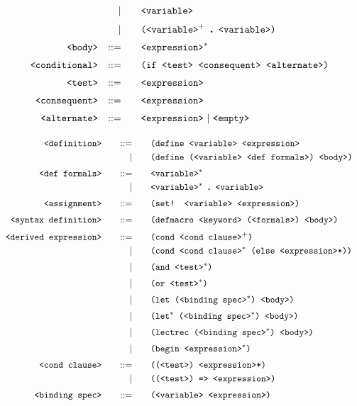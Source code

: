 \documentclass{article}
\begin{document}
\begin{alignat*}{7}
&&                       && |   &\quad && \texttt{<variable>}  \\[1mm]
&&                       && |   &\quad && \texttt{(<variable>$^+$ \bm{$.$} <variable>)}  \\[1mm]
&& \texttt{<body>}  && ::= &\quad && \texttt{<expression>$^*$}\\[1mm]
&& \texttt{<conditional>}  && ::= &\quad && \texttt{(if <test> <consequent> <alternate>)}\\[1mm]
&& \texttt{<test>}  && ::= &\quad && \texttt{<expression>}\\[1mm]
&& \texttt{<consequent>}  && ::= &\quad && \texttt{<expression>}\\[1mm]
&& \texttt{<alternate>}  && ::= &\quad && \texttt{<expression>}\ | \ \texttt{<empty>}\\[1mm]
\end{alignat*}

\newpage
\begin{alignat*}{7}
&& \texttt{<definition>}    &&\quad ::= &\quad && \texttt{(define <variable> <expression>}\\
&&                       && |   &\quad && \texttt{(define (<variable> <def formals>) <body>)}  \\[1mm]
&& \texttt{<def formals>}    &&\quad ::= &\quad && \texttt{<variable>$^*$}\\
&&                       && |   &\quad && \texttt{<variable>$^*$ \bm{$.$} <variable>}\\[1mm]
&& \texttt{<assignment>}  && ::= &\quad && \texttt{(set! <variable> <expression>)} \\[1mm]
&& \texttt{<syntax definition>}  && ::= &\quad && \texttt{(defmacro <keyword> (<formals>) <body>)}\\[1mm]
&& \texttt{<derived expression>}    &&::= &\quad && \texttt{(cond <cond clause>$^+$)}\\
&&                       && |   &\quad && \texttt{(cond <cond clause>$^*$ (else <expression>*))}  \\[1mm]
&&                       && |   &\quad && \texttt{(and <test>$^*$)}  \\[1mm]
&&                       && |   &\quad && \texttt{(or <test>$^*$)}  \\[1mm]
&&                       && |   &\quad && \texttt{(let (<binding spec>$^*$) <body>)}  \\[1mm]
&&                       && |   &\quad && \texttt{(let$^*$ (<binding spec>$^*$) <body>)}  \\[1mm]
&&                       && |   &\quad && \texttt{(lectrec (<binding spec>$^*$) <body>)} \\[1mm]
&&                       && |   &\quad && \texttt{(begin <expression>$^*$)}  \\[1mm]
&& \texttt{<cond clause>} && \quad ::= &\quad && \texttt{((<test>) <expression>*)} \\
&&                       && | &\quad && \texttt{((<test>) => <expression>)} \\[1mm]
&& \texttt{<binding spec>}  && ::= &\quad && \texttt{(<variable> <expression>)}  \\[1mm]
\end{alignat*}
\end{document}
